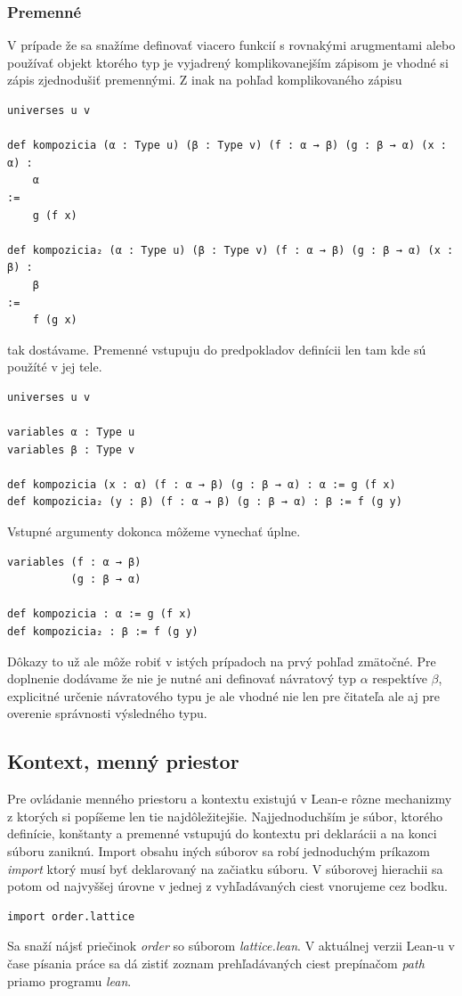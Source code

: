 \documentclass[a4paper,10pt,oneside]{report}%
\begin{document}
\subsubsection{Premenné}
    V prípade že sa snažíme definovať viacero funkcií s rovnakými arugmentami alebo
používať objekt ktorého typ je vyjadrený komplikovanejším zápisom je vhodné si
zápis zjednodušiť premennými.
    Z inak na pohľad komplikovaného zápisu
\begin{lstlisting}
universes u v

def kompozicia (α : Type u) (β : Type v) (f : α → β) (g : β → α) (x : α) :
    α
:=
    g (f x)

def kompozicia₂ (α : Type u) (β : Type v) (f : α → β) (g : β → α) (x : β) :
    β
:=
    f (g x)
\end{lstlisting}
    tak dostávame.
    Premenné vstupuju do predpokladov definícii len tam kde sú použíté v jej tele.
\begin{lstlisting}
universes u v

variables α : Type u
variables β : Type v

def kompozicia (x : α) (f : α → β) (g : β → α) : α := g (f x)
def kompozicia₂ (y : β) (f : α → β) (g : β → α) : β := f (g y)
\end{lstlisting}
Vstupné argumenty dokonca môžeme vynechať úplne.
\begin{lstlisting}
variables (f : α → β)
          (g : β → α)

def kompozicia : α := g (f x)
def kompozicia₂ : β := f (g y)
\end{lstlisting}
Dôkazy to už ale môže robiť v istých prípadoch na prvý pohľad zmätočné.
Pre doplnenie dodávame že nie je nutné ani definovať návratový typ $\alpha$
    respektíve $\beta$, explicitné určenie návratového typu je ale vhodné nie len
    pre čitateľa ale aj pre overenie správnosti výsledného typu.
\subsection{Kontext, menný priestor}
    Pre ovládanie menného priestoru a kontextu existujú v Lean-e rôzne mechanizmy
z ktorých si popíšeme len tie najdôležitejšie.
    Najjednoduchším je súbor, ktorého definície, konštanty a premenné vstupujú do
kontextu pri deklarácii a na konci súboru zaniknú.
    Import obsahu iných súborov sa robí jednoduchým príkazom \emph{import} ktorý
musí byť deklarovaný na začiatku súboru. V súborovej hierachii sa potom od najvyššej
úrovne v jednej z vyhľadávaných ciest vnorujeme cez bodku.
\begin{lstlisting}
import order.lattice
\end{lstlisting}
    Sa snaží nájsť priečinok \emph{order} so súborom \emph{lattice.lean}.
    V aktuálnej verzii Lean-u v čase písania práce sa dá zistiť zoznam prehľadávaných
ciest prepínačom \emph{path} priamo programu \emph{lean}.
\end{document}
